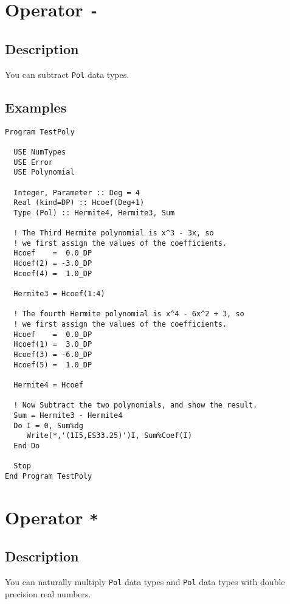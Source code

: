 \section{Operator \texttt{-}}

\subsection{Description}

You can subtract \texttt{Pol} data types.

\subsection{Examples}

\begin{verbatim}
Program TestPoly

  USE NumTypes
  USE Error
  USE Polynomial

  Integer, Parameter :: Deg = 4
  Real (kind=DP) :: Hcoef(Deg+1)
  Type (Pol) :: Hermite4, Hermite3, Sum

  ! The Third Hermite polynomial is x^3 - 3x, so
  ! we first assign the values of the coefficients.
  Hcoef    =  0.0_DP
  Hcoef(2) = -3.0_DP
  Hcoef(4) =  1.0_DP

  Hermite3 = Hcoef(1:4)

  ! The fourth Hermite polynomial is x^4 - 6x^2 + 3, so
  ! we first assign the values of the coefficients.
  Hcoef    =  0.0_DP
  Hcoef(1) =  3.0_DP
  Hcoef(3) = -6.0_DP
  Hcoef(5) =  1.0_DP

  Hermite4 = Hcoef

  ! Now Subtract the two polynomials, and show the result.
  Sum = Hermite3 - Hermite4
  Do I = 0, Sum%dg
     Write(*,'(1I5,ES33.25)')I, Sum%Coef(I)
  End Do

  Stop
End Program TestPoly
\end{verbatim}

\section{Operator \texttt{*}}

\subsection{Description}

You can naturally multiply \texttt{Pol} data types and \texttt{Pol}
data types with double precision real numbers.

